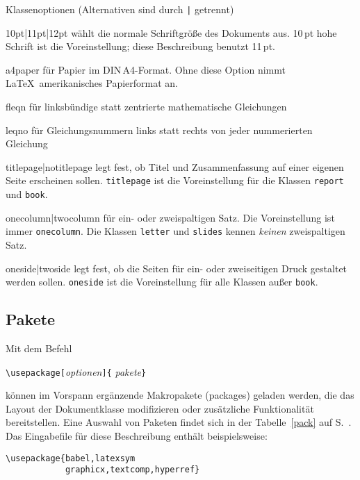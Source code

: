 \begin{table}[hbpt]
\caption[Klassenoptionen]{Klassenoptionen (Alternativen sind durch \texttt{|}
  getrennt)} \label{options}
\begin{lminipage}{11cm}
\begin{ttdescription}%
\item [10pt|11pt|12pt] wählt die normale Schriftgröße des Dokuments aus.
  10\,pt hohe Schrift ist die Voreinstellung; diese Beschreibung benutzt 11\,pt.

\item[a4paper] für Papier im DIN\,A4-Format. Ohne diese
  Option nimmt \LaTeX\ amerikanisches Papierformat an.
 
\item [fleqn] für linksbündige statt zentrierte mathematische
  Gleichungen
 
\item [leqno] für Gleichungsnummern links statt rechts von jeder
  nummerierten Gleichung
 
\item [titlepage|notitlepage] legt fest, ob Titel und Zusammenfassung
  auf einer eigenen Seite erscheinen sollen.  \texttt{titlepage} ist
  die Voreinstellung für die Klassen \texttt{report} und \texttt{book}.
 
\item [onecolumn|twocolumn] für ein- oder zweispaltigen Satz.
 Die Voreinstellung ist immer \texttt{onecolumn}.  
 Die Klassen \texttt{letter} und \texttt{slides} kennen \emph{keinen}
 zweispaltigen Satz.
 
\item [oneside|twoside] legt fest, ob die Seiten für ein- oder
  zweiseitigen  Druck gestaltet werden sollen.  
  \texttt{oneside} ist die Voreinstellung für
  alle Klassen außer \texttt{book}.
  
\end{ttdescription}
\end{lminipage}
\end{table}



\subsection{Pakete}\label{packages}
 
Mit dem Befehl
\begin{beispiel}
\verb:\usepackage[:\textit{optionen}\verb:]{:%
  \textit{pakete}\verb:}:
\end{beispiel}
können im Vorspann ergänzende Makropakete (packages) geladen werden,
die das Layout der Dokumentklasse
modifizieren oder zusätzliche Funktionalität bereitstellen.
Eine Auswahl von Paketen findet sich in der Tabelle~\ref{pack} 
auf S.~\pageref{pack}.
Das Eingabefile für diese Beschreibung enthält beispielsweise:
\begin{beispiel}
\verb|\usepackage{babel,latexsym|\\
\verb|            graphicx,textcomp,hyperref}|
\end{beispiel}


